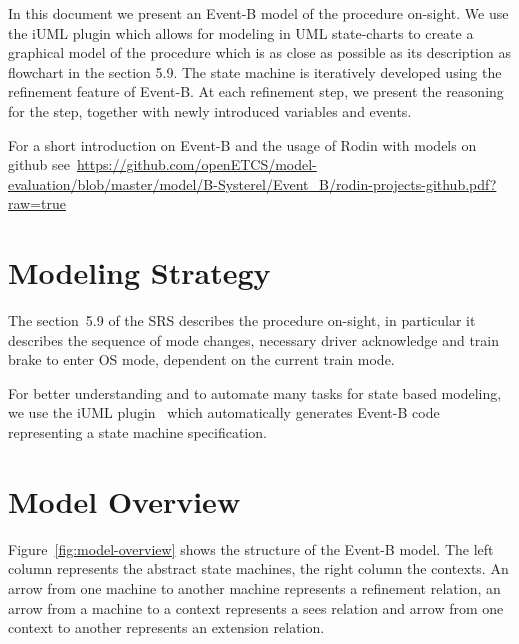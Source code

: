 \documentclass{template/openetcs_article}
\begin{document}
In this document we present an Event-B model of the procedure on-sight. We use
the iUML plugin which allows for modeling in UML state-charts to create a
graphical model of the procedure which is as close as possible as its
description as flowchart in the section 5.9. The state machine is iteratively
developed using the refinement feature of Event-B. At each refinement step, we
present the reasoning for the step, together with newly introduced variables and
events.

For a short introduction on Event-B and the usage of Rodin with models on github
see~\url{https://github.com/openETCS/model-evaluation/blob/master/model/B-Systerel/Event_B/rodin-projects-github.pdf?raw=true}


\section{Modeling Strategy}
\label{sec:modeling-strategy}

The section~5.9 of the SRS describes the procedure on-sight, in particular it
describes the sequence of mode changes, necessary driver acknowledge and train
brake to enter OS mode, dependent on the current train mode.

For better understanding and to automate many tasks for state based modeling, we
use the iUML plugin~\cite{UML-plugin} which automatically generates Event-B code
representing a state machine specification.

\section{Model Overview}
\label{sec:model-overview}

Figure~\ref{fig:model-overview} shows the structure of the Event-B model. The
left column represents the abstract state machines, the right column the
contexts. An arrow from one machine to another machine represents a refinement
relation, an arrow from a machine to a context represents a sees relation and
arrow from one context to another represents an extension relation.
\end{document}
